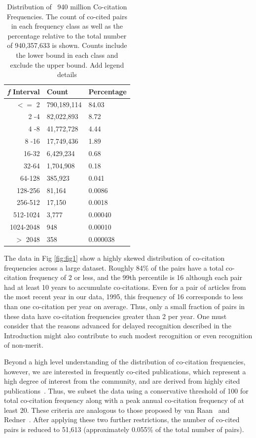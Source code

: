 \documentclass[utf8]{frontiersSCNS}
\newcommand\Tstrut{\rule{0pt}{2.9ex}} %
\begin{document}
\begin{table}[ht]
\caption{Distribution of ~940 million Co-citation Frequencies. The count of co-cited pairs in each frequency class as well as the percentage relative to the total number of 940,357,633 is shown. Counts include the lower bound in each class and exclude the upper bound. Add legend details}%
\centering %
\begin{center}
\begin{tabular}{rll} 
\emph{f} Interval & Count & Percentage \\
\hline %
$<=$ 2 & 790,189,114 & 84.03 \Tstrut\\ 
2 -4 & 82,022,893 & 8.72 \\
4 -8 & 41,772,728 & 4.44 \\
8 -16 & 17,749,436 & 1.89 \\
16-32 & 6,429,234 & 0.68\\
32-64 & 1,704,908 & 0.18\\
64-128 & 385,923 & 0.041\\
128-256 & 81,164 & 0.0086\\ 
256-512 & 17,150 & 0.0018\\
512-1024 & 3,777 & 0.00040\\
1024-2048 & 948 & 0.00010\\ 
$> $ 2048 & 358 & 0.000038\\   
\hline 
\end{tabular}
\end{center}
\label{tab:table1} %
\end{table}


The data in Fig \ref{fig:fig1} show a highly skewed distribution of co-citation frequencies across a large dataset. Roughly 84\% of the pairs have a total co-citation frequency of 2 or less, and the 99th percentile is 16 although each pair had at least 10 years to accumulate co-citations. Even for a pair of articles from the most recent year in our data, 1995, this frequency of 16 corresponds to less than one co-citation per year on average. Thus, only a small fraction of pairs in these data have co-citation frequencies greater than 2 per year. One must consider that the reasons advanced for delayed recognition described in the Introduction might also contribute to such modest recognition or even recognition of non-merit.

Beyond a high level understanding of the distribution of co-citation frequencies, however, we are interested in frequently co-cited publications, which represent a high degree of interest from the community, and are derived from highly cited publications~\citep{Small1973}. Thus, we subset the data using a conservative threshold of 100 for total co-citation frequency along with a peak annual co-citation frequency of at least 20. These criteria are analogous to those proposed by van Raan~\citep{Raan2004} and Redner~\citep{redner_2005}. After applying these two further restrictions, the number of co-cited pairs is reduced to 51,613 (approximately 0.055\% of the total number of pairs).
\end{document}
